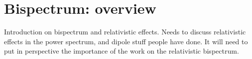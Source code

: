 \chapter{Bispectrum: overview}
\label{chapter:introbisp}

Introduction on bispectrum and relativistic effects. Needs to discuss relativistic effects in the power spectrum, and dipole stuff people have done. It will need to put in perspective the importance of the work on the relativistic bispectrum. 